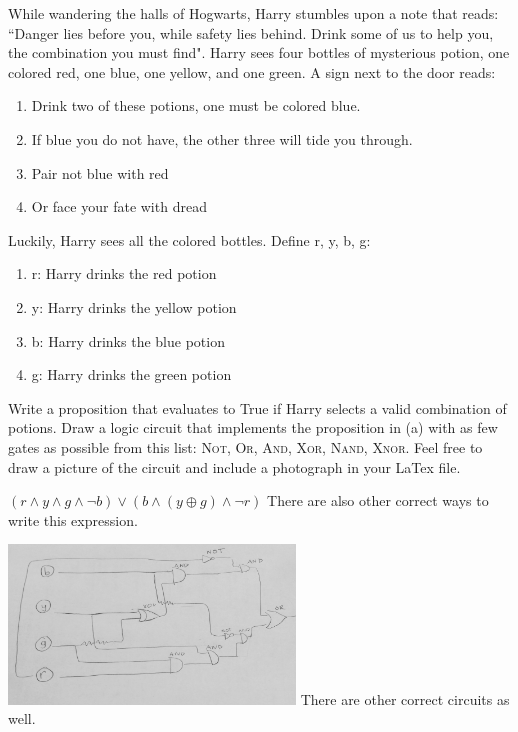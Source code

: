 \documentclass[solution, letterpaper]{cs20}
\begin{document}


While wandering the halls of Hogwarts, Harry stumbles upon a note that reads: ``Danger lies before you, while safety lies behind. Drink some of us to help you, the combination you must find". Harry sees four bottles of mysterious potion, one colored red, one blue, one yellow, and one green. A sign next to the door reads:

\begin{enumerate}
\item Drink two of these potions, one must be colored blue.
\item If blue you do not have, the other three will tide you through.
\item Pair not blue with red
\item Or face your fate with dread
\end{enumerate}

Luckily, Harry sees all the colored bottles. Define r, y, b, g:
\begin{enumerate}
\item r: Harry drinks the red potion
\item y: Harry drinks the yellow potion
\item b: Harry drinks the blue potion
\item g: Harry drinks the green potion
\end{enumerate}

\subproblem Write a proposition that evaluates to True if Harry selects a valid combination of potions. 
\subproblem Draw a logic circuit that implements the proposition in (a) with as few gates as possible from this list: \textsc{Not}, \textsc{Or}, \textsc{And}, \textsc{Xor}, \textsc{Nand}, \textsc{Xnor}. Feel free to draw a picture of the circuit and include a photograph in your LaTex file. 

\begin{solution}

\subsolution $(r \land y \land g \land \lnot b) \lor (b \land (y \oplus g) \land \lnot r)$
There are also other correct ways to write this expression. 

\subsolution 
\includegraphics[width=3in]{LogicGate.jpg}
There are other correct circuits as well. 

\end{solution}
\end{document}
